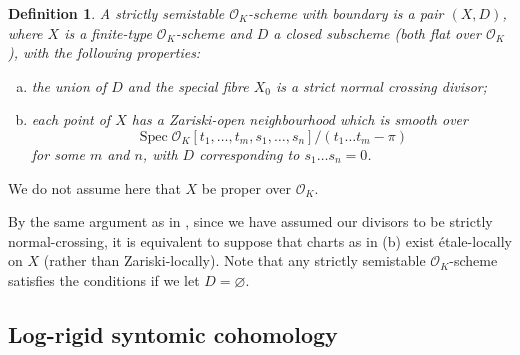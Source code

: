 \documentclass[cjm]{ipart}
\theoremstyle{plain}
\newtheorem{definition}[theorem]{Definition}
\theoremstyle{remark}
\DeclareMathOperator{\Spec}{Spec}
\newcommand{\cO}{\mathcal{O}}
\numberwithin{equation}{subsection}
\begin{document}
  \begin{definition}\label{def:SSschemeboundary}
   A \emph{strictly semistable $\cO_K$-scheme with boundary} is a pair $(X, D)$, where $X$ is a finite-type $\cO_K$-scheme and $D$ a closed subscheme (both flat over $\cO_K$), with the following properties:
   \begin{enumerate}[(a)]
   \item the union of $D$ and the special fibre $X_0$ is a strict normal crossing divisor;
   \item each point of $X$ has a Zariski-open neighbourhood which is smooth over
   \[ \Spec \cO_K[t_1, \dots, t_m, s_1, \dots, s_n] / (t_1\dots t_m - \pi)\]
   for some $m$ and $n$, with $D$ corresponding to $s_1\dots s_n = 0$.
   \end{enumerate}
  \end{definition}

  \begin{remark}
   We do not assume here that $X$ be proper over $\cO_K$.
  \end{remark}

  By the same argument as in \cite[\S 2.1]{grossekloenne05}, since we have assumed our divisors to be strictly normal-crossing, it is equivalent to suppose that charts as in (b) exist \'etale-locally on $X$ (rather than Zariski-locally). Note that any strictly semistable $\cO_K$-scheme satisfies the conditions if we let $D = \varnothing$.

 \subsection{Log-rigid syntomic cohomology}
\end{document}
